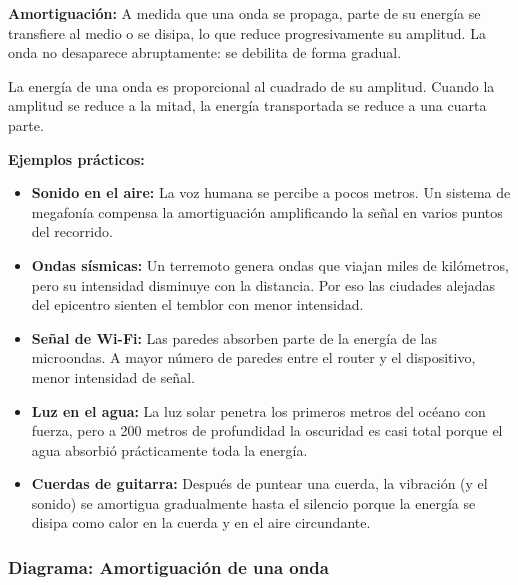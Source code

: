 \begin{seccion}
\begin{definicion}
\textbf{Amortiguación:} A medida que una onda se propaga, parte de su energía se transfiere al medio o se disipa, lo que reduce progresivamente su amplitud. La onda no desaparece abruptamente: se debilita de forma gradual.
\end{definicion}

La energía de una onda es proporcional al cuadrado de su amplitud. Cuando la amplitud se reduce a la mitad, la energía transportada se reduce a una cuarta parte.

\textbf{Ejemplos prácticos:}
\begin{itemize}
    \item \textbf{Sonido en el aire:} La voz humana se percibe a pocos metros. Un sistema de megafonía compensa la amortiguación amplificando la señal en varios puntos del recorrido.
    \item \textbf{Ondas sísmicas:} Un terremoto genera ondas que viajan miles de kilómetros, pero su intensidad disminuye con la distancia. Por eso las ciudades alejadas del epicentro sienten el temblor con menor intensidad.
    \item \textbf{Señal de Wi-Fi:} Las paredes absorben parte de la energía de las microondas. A mayor número de paredes entre el router y el dispositivo, menor intensidad de señal.
    \item \textbf{Luz en el agua:} La luz solar penetra los primeros metros del océano con fuerza, pero a 200 metros de profundidad la oscuridad es casi total porque el agua absorbió prácticamente toda la energía.
    \item \textbf{Cuerdas de guitarra:} Después de puntear una cuerda, la vibración (y el sonido) se amortigua gradualmente hasta el silencio porque la energía se disipa como calor en la cuerda y en el aire circundante.
\end{itemize}
\end{seccion}

\subsubsection{Diagrama: Amortiguación de una onda}

